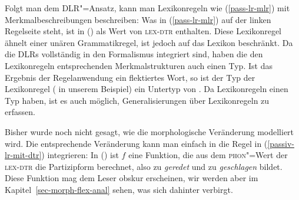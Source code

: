 Folgt man dem DLR"=Ansatz, kann man Lexikonregeln wie (\ref{pass-lr-mlr}) mit Merkmalbeschreibungen
beschreiben:\label{pageref-lr-mit-dtr}
\ea
\label{passiv-lr-mit-dtr}
\z
Was in (\ref{pass-lr-mlr}) auf der linken Regelseite steht, ist in () als
Wert von \textsc{lex-dtr} enthalten. Diese Lexikonregel ähnelt einer unären Grammatikregel,
ist jedoch auf das Lexikon beschränkt. Da die DLRs vollständig in den Formalismus integriert
sind, haben die den Lexikonregeln entsprechenden Merkmalstrukturen auch einen Typ. Ist das Ergebnis der
Regelanwendung ein flektiertes Wort, so ist der Typ der Lexikonregel ( in unserem Beispiel)
ein Untertyp von . Da Lexikonregeln einen Typ haben, ist es auch möglich, Generalisierungen über Lexikonregeln
zu erfassen.



Bisher wurde noch nicht gesagt, wie die morphologische Veränderung modelliert wird.
Die entsprechende Veränderung kann man einfach in die Regel in (\ref{passiv-lr-mit-dtr}) integrieren:
\ea
\label{passive-lr-mit-phon}
\z
In () ist $f$ eine Funktion, die aus dem \textsc{phon}"=Wert der \textsc{lex-dtr} die Partizipform berechnet,
also zu  \emph{geredet} und zu  \emph{geschlagen} bildet.
Diese Funktion mag dem Leser obskur erscheinen, wir werden aber im Kapitel~\ref{sec-morph-flex-anal}
sehen, was sich dahinter verbirgt.

